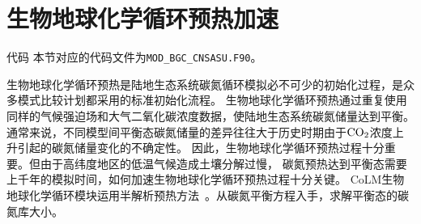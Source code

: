 \chapter{生物地球化学循环预热加速}\label{生物地球化学循环预热加速}
\begin{mymdframed}{代码}
  本节对应的代码文件为\texttt{MOD\_BGC\_CNSASU.F90}。
\end{mymdframed}

生物地球化学循环预热是陆地生态系统碳氮循环模拟必不可少的初始化过程，是众多模式比较计划都采用的标准初始化流程。
生物地球化学循环预热通过重复使用同样的气候强迫场和大气二氧化碳浓度数据，使陆地生态系统碳氮储量达到平衡。
通常来说，不同模型间平衡态碳氮储量的差异往往大于历史时期由于$\rm CO_2$浓度上升引起的碳氮储量变化的不确定性。
因此，生物地球化学循环预热过程十分重要。但由于高纬度地区的低温气候造成土壤分解过慢，
碳氮预热达到平衡态需要上千年的模拟时间，如何加速生物地球化学循环预热过程十分关键。
CoLM生物地球化学循环模块运用半解析预热方法~\citep{xia2012semi}。从碳氮平衡方程入手，求解平衡态的碳氮库大小。


